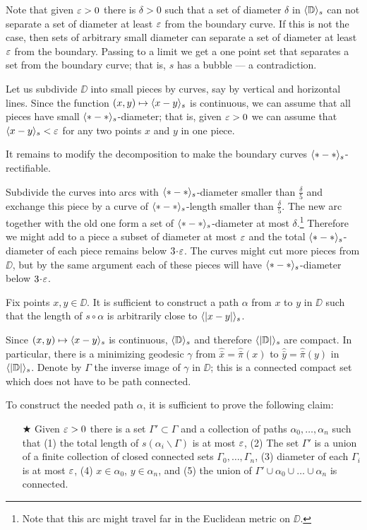 Note that given $\varepsilon>0$ there is $\delta>0$ such that a set of diameter $\delta$ in $\langle\mathbb{D}\rangle_s$ can not separate a set of diameter at least $\varepsilon$ from the boundary curve.
If this is not the case, 
then sets of arbitrary small diameter can separate a set of diameter at least $\varepsilon$ from the boundary.
Passing to a limit we get a one point set that separates a set from the boundary curve; that is, $s$ has a bubble --- a contradiction. 

Let us subdivide $\DD$ into small pieces by curves, say by vertical and horizontal lines.
Since the function $(x,y)\mapsto \langle x-y\rangle_s$ is continuous,
we can assume that all pieces have small $\langle{*}-{*}\rangle_s$-diameter;
that is, given $\varepsilon>0$ we can assume that $\langle x-y\rangle_s<\varepsilon$ for any two points $x$ and $y$ in one piece.

It remains to modify the decomposition to make the boundary curves $\langle{*}-{*}\rangle_s$-rectifiable.

Subdivide the curves into arcs with $\langle{*}-{*}\rangle_s$-diameter smaller than $\tfrac{\delta}{5}$ and exchange this piece by a curve of $\langle{*}-{*}\rangle_s$-length smaller than $\tfrac{\delta}{5}$.
The new arc together with the old one form a set of  $\langle{*}-{*}\rangle_s$-diameter at most $\delta$.\footnote{Note that this arc might travel far in the Euclidean metric on $\DD$.}
Therefore we might add to a piece a subset of diameter at most $\varepsilon$ and the total $\langle{*}-{*}\rangle_s$-diameter of each piece remains below $3\cdot\eps$.
The curves might cut more pieces from $\DD$, but by the same argument each of these pieces will have $\langle{*}-{*}\rangle_s$-diameter below $3\cdot\eps$.
\qeds

Fix points $x,y\in \DD$.
It is sufficient to construct a path $\alpha$ from $x$ to $y$ in $\DD$ such that the length of $s\circ\alpha$ is arbitrarily close to $\langle|x-y|\rangle_s$.

Since $(x,y)\mapsto \langle x-y\rangle_s$ is continuous, $\langle\mathbb{D}\rangle_s$ and therefore $\langle|\mathbb{D}|\rangle_s$ are compact.
In particular, there is a minimizing geodesic $\gamma$ from $\hat{\bar x}=\hat{\bar \pi}(x)$ to $\hat{\bar y}=\hat{\bar \pi}(y)$ in $\langle|\mathbb{D}|\rangle_s$.
Denote by $\Gamma$ the inverse image of $\gamma$ in $\DD$;
this is a connected compact set which does not have to be path connected.

To construct the needed path $\alpha$, it is sufficient to prove the following claim:

\begin{itemize}
 \item[$\bigstar$] Given $\varepsilon>0$ there is a set $\Gamma'\subset \Gamma$ 
 and a collection of paths $\alpha_0,\dots,\alpha_n$ such that 
 (1) the total length of $s(\alpha_i\backslash\Gamma)$ is at most $\varepsilon$, 
 (2) The set $\Gamma'$ is a union of a finite collection of closed connected sets $\Gamma_0,\dots,\Gamma_n$, 
 (3) diameter of each $\Gamma_i$ is at most $\varepsilon$, 
 (4) $x\in\alpha_0$, $y\in\alpha_n$, and 
 (5) the union of $\Gamma'\cup \alpha_0\cup\dots\cup\alpha_n$ is connected.
\end{itemize}

